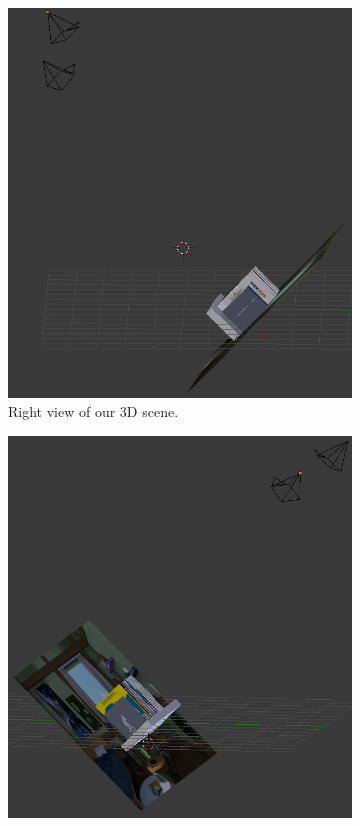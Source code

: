 \documentclass[12pt]{article}
\begin{document}
\begin{figure}[htbp]
        \centering
        \begin{subfigure}[b]{0.45\textwidth}
                \includegraphics[width=\textwidth]{images/blender3}
                \caption{Right view of our 3D scene.}
                \label{fig:blender1}
        \end{subfigure}
        \begin{subfigure}[b]{0.45\textwidth}
                \includegraphics[width=\textwidth]{images/blender6}

\end{subfigure}
\end{figure}
\end{document}
